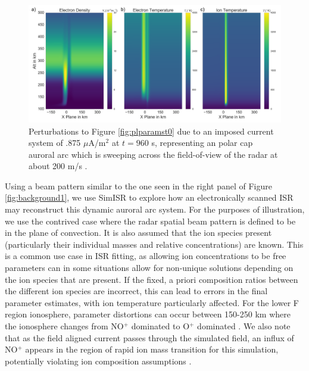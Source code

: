 \begin{figure}[!t]
\centering
\includegraphics[width=6in]{0960_15_int}
\caption{Perturbations to Figure \ref{fig:plparamst0} due to an imposed current system of .875 $\mu$A/m$^2$ at $t=960$ s, representing an polar cap auroral arc which is sweeping across the field-of-view of the radar at about 200 m/s \cite{Perry:2015jf}.}
\label{fig:plparamst60}
\end{figure}

Using a beam pattern similar to the one seen in the right panel of Figure \ref{fig:background1}, we use SimISR to explore how an electronically scanned ISR may reconstruct this dynamic auroral arc system.  For the purposes of illustration, we use the contrived case where the radar spatial beam pattern is defined to be in the plane of convection.  It is also assumed that the ion species present (particularly their individual masses and relative concentrations) are known. This is a common use case in ISR fitting, as allowing ion concentrations to be free parameters can in some situations allow for non-unique solutions depending on the ion species that are present.  If the fixed, a priori composition ratios between the different ion species are incorrect, this can lead to errors in the final parameter estimates, with ion temperature particularly affected. For the lower F region ionosphere, parameter distortions can occur between 150-250 km where the ionosphere changes from NO$^+$ dominated to O$^+$ dominated \cite{Zettergren:2011ej,Blelly:2010gf}. We also note that as the field aligned current passes through the simulated field, an influx of NO$^+$ appears in the region of rapid ion mass transition for this simulation, potentially violating ion composition assumptions \cite{Perry:2015jf}.

